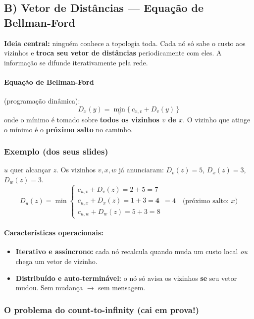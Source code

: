 \documentclass[11pt,a4paper]{article}
\begin{document}
\hrulefill

\subsection{B) Vetor de Distâncias --- Equação de Bellman-Ford}

\textbf{Ideia central:} ninguém conhece a topologia toda. Cada nó só sabe o custo aos vizinhos e \textbf{troca seu vetor de distâncias} periodicamente com eles. A informação se difunde iterativamente pela rede.

\paragraph{Equação de Bellman-Ford} (programação dinâmica):
\[
D_x(y) = \min_{v}\big\{\, c_{x,v} + D_v(y) \,\big\}
\]
onde o mínimo é tomado sobre \textbf{todos os vizinhos $v$ de $x$}. O vizinho que atinge o mínimo é o \textbf{próximo salto} no caminho.

\subsubsection{Exemplo (dos seus slides)}

$u$ quer alcançar $z$. Os vizinhos $v, x, w$ já anunciaram: $D_v(z)=5$, $D_x(z)=3$, $D_w(z)=3$.
\[
D_u(z) = \min
\begin{cases}
c_{u,v} + D_v(z) = 2 + 5 = 7 \\
c_{u,x} + D_x(z) = 1 + 3 = \mathbf{4} \\
c_{u,w} + D_w(z) = 5 + 3 = 8
\end{cases}
= 4 \quad \text{(próximo salto: } x\text{)}
\]

\paragraph{Características operacionais:}
\begin{itemize}
    \item \textbf{Iterativo e assíncrono:} cada nó recalcula quando muda um custo local \textit{ou} chega um vetor de vizinho.
    \item \textbf{Distribuído e auto-terminável:} o nó só avisa os vizinhos \textbf{se} seu vetor mudou. Sem mudança $\to$ sem mensagem.
\end{itemize}

\subsubsection{O problema do count-to-infinity (cai em prova!)}
\end{document}
